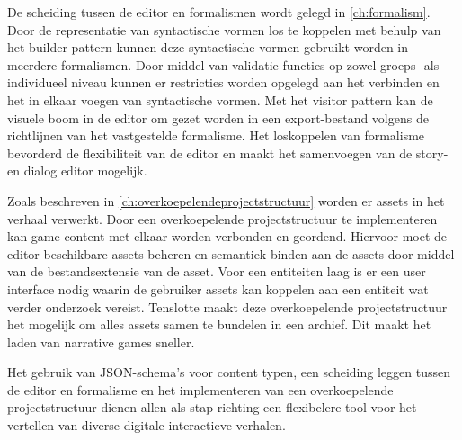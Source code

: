 De scheiding tussen de editor en formalismen wordt gelegd in \autoref{ch:formalism}. Door de representatie van syntactische vormen los te koppelen met behulp van het builder pattern kunnen deze syntactische vormen gebruikt worden in meerdere formalismen. Door middel van validatie functies op zowel groeps- als individueel niveau kunnen er restricties worden opgelegd aan het verbinden en het in elkaar voegen van syntactische vormen. Met het visitor pattern kan de visuele boom in de editor om gezet worden in een export-bestand volgens de richtlijnen van het vastgestelde formalisme. Het loskoppelen van formalisme bevorderd de flexibiliteit van de editor en maakt het samenvoegen van de story- en dialog editor mogelijk.

Zoals beschreven in \autoref{ch:overkoepelendeprojectstructuur} worden er assets in het verhaal verwerkt. Door een overkoepelende projectstructuur te implementeren kan game content met elkaar worden verbonden en geordend. Hiervoor moet de editor beschikbare assets beheren en semantiek binden aan de assets door middel van de bestandsextensie van de asset. Voor een entiteiten laag is er een user interface nodig waarin de gebruiker assets kan koppelen aan een entiteit wat verder onderzoek vereist. Tenslotte maakt deze overkoepelende projectstructuur het mogelijk om alles assets samen te bundelen in een archief. Dit maakt het laden van narrative games sneller.

Het gebruik van JSON-schema’s voor content typen, een scheiding leggen tussen de editor en formalisme en het implementeren van een overkoepelende projectstructuur dienen allen als stap richting een flexibelere tool voor het vertellen van diverse digitale interactieve verhalen.

